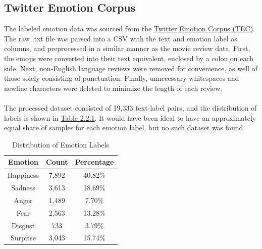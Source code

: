 \documentclass[11pt]{article}
\begin{document}
\subsection{Twitter Emotion Corpus}
The labeled emotion data was sourced from the \href{https://socialmediaie.github.io/MetaCorpus/#:~:text=Hashtag\%20Emotion\%20Corpus\%20(aka\%20Twitter\%20Emotion\%20Corpus,\%20or\%20TEC)}{Twitter Emotion Corpus (TEC)}. The raw .txt file was parsed into a CSV with the text and emotion label as columns, and preprocessed in a similar manner as the movie review data. First, the emojis were converted into their text equivalent, enclosed by a colon on each side. Next, non-English language reviews were removed for convenience, as well of those solely consisting of punctuation. Finally, unnecessary whitespaces and newline characters were deleted to minimize the length of each review. \\ \\
The processed dataset consisted of 19,333 text-label pairs, and the distribution of labels is shown in \hyperref[tab:emotion_label_distribution]{Table 2.2.1}. It would have been ideal to have an approximately equal share of samples for each emotion label, but no such dataset was found.
\renewcommand{\thetable}{2.2.1}
\begin{table}[h]
    	\centering
    	\begin{tabular}{c c c}
        		\toprule
        		\textbf{Emotion} & \textbf{Count} & \textbf{Percentage} \\
        		\midrule
        		Happiness & 7,892 & 40.82\% \\
        		Sadness & 3,613 & 18.69\% \\
        		Anger & 1,489 & 7.70\% \\
        		Fear & 2,563 & 13.28\% \\
        		Disgust & 733 & 3.79\% \\
        		Surprise & 3,043 & 15.74\% \\
        		\bottomrule
    	\end{tabular}
    	\caption{Distribution of Emotion Labels}
	\label{tab:emotion_label_distribution}
\end{table}
\end{document}
